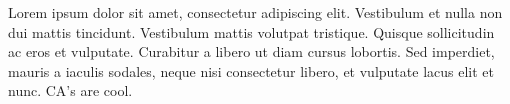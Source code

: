 Lorem ipsum dolor sit amet, consectetur adipiscing elit.
Vestibulum et nulla non dui mattis tincidunt.
Vestibulum mattis volutpat tristique.
Quisque sollicitudin ac eros et vulputate.
Curabitur a libero ut diam cursus lobortis.
Sed imperdiet, mauris a iaculis sodales, neque nisi consectetur libero, et vulputate lacus elit et nunc.
CA's are cool.

